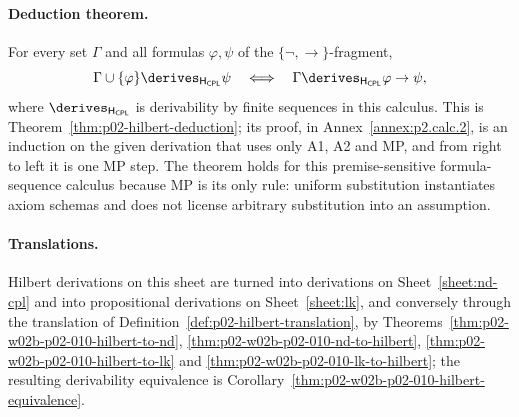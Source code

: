 
\paragraph{Deduction theorem.}
For every set \(\Gamma\) and all formulas \(\varphi,\psi\) of the
\(\{\neg,\to\}\)-fragment,
\[
 \Gamma\cup\{\varphi\}\derives_{\mathsf H_{\mathsf{CPL}}}\psi
 \quad\Longleftrightarrow\quad
 \Gamma\derives_{\mathsf H_{\mathsf{CPL}}}\varphi\to\psi ,
\]
where \(\derives_{\mathsf H_{\mathsf{CPL}}}\) is derivability by finite
sequences in this calculus.  This is Theorem~\ref{thm:p02-hilbert-deduction};
its proof, in Annex~\ref{annex:p2.calc.2}, is an induction on the given
derivation that uses only A1, A2 and MP, and from right to left it is one MP
step.  The theorem holds for this premise-sensitive formula-sequence calculus
because MP is its only rule: uniform substitution instantiates axiom
schemas and does not license arbitrary substitution into an assumption.

\paragraph{Translations.}
Hilbert derivations on this sheet are turned into derivations on
Sheet~\ref{sheet:nd-cpl} and into propositional derivations on
Sheet~\ref{sheet:lk}, and conversely through the translation of
Definition~\ref{def:p02-hilbert-translation}, by
Theorems~\ref{thm:p02-w02b-p02-010-hilbert-to-nd},
\ref{thm:p02-w02b-p02-010-nd-to-hilbert},
\ref{thm:p02-w02b-p02-010-hilbert-to-lk} and
\ref{thm:p02-w02b-p02-010-lk-to-hilbert}; the resulting derivability
equivalence is Corollary~\ref{thm:p02-w02b-p02-010-hilbert-equivalence}.
